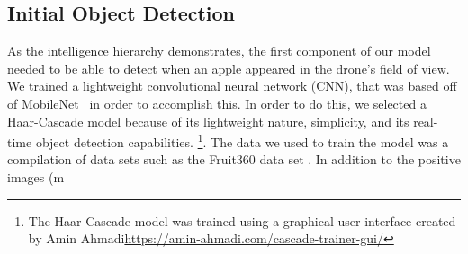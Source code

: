 \subsection{Initial Object Detection}
As the intelligence hierarchy demonstrates, the first component of our model needed to be able to detect when an apple appeared in the drone's field of view. 
We trained a lightweight convolutional neural network (CNN), that was based off of MobileNet~\cite{Sandler2018,PyTorchMobileNet} in order to accomplish this. 
In order to do this, we selected a Haar-Cascade model because of its lightweight nature, simplicity, and its real-time object detection capabilities.
\footnote{The Haar-Cascade model was trained using a graphical user interface created by Amin Ahmadi\url{https://amin-ahmadi.com/cascade-trainer-gui/}}. 
The data we used to train the model was a compilation of data sets such as the Fruit360 data set \cite{Fruit360}.
In addition to the positive images (m